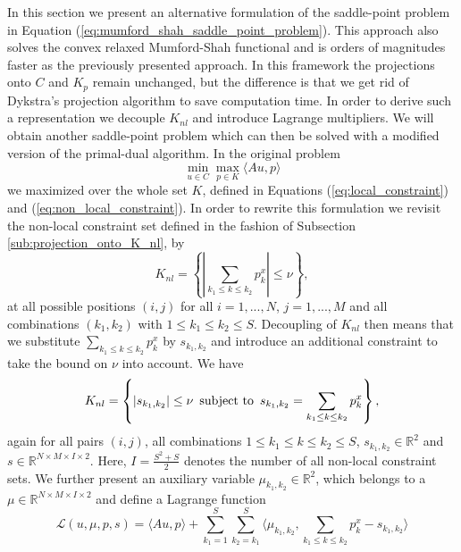 \documentclass[abstracton]{scrreprt}
\begin{document}
        In this section we present an alternative formulation of the saddle-point problem in Equation (\ref{eq:mumford_shah_saddle_point_problem}). This approach also solves the convex relaxed Mumford-Shah functional and is orders of magnitudes faster as the previously presented approach. In this framework the projections onto $C$ and $K_{p}$ remain unchanged, but the difference is that we get rid of Dykstra's projection algorithm to save computation time. In order to derive such a representation we decouple $K_{nl}$ and introduce Lagrange multipliers. We will obtain another saddle-point problem which can then be solved with a modified version of the primal-dual algorithm. In the original problem
            \begin{equation}
                \min_{u \in C} \max_{p \in K} \langle Au, p \rangle
                \label{eq:original_saddle_point_problem}
            \end{equation}
        we maximized over the whole set $K$, defined in Equations (\ref{eq:local_constraint}) and (\ref{eq:non_local_constraint}). In order to rewrite this formulation we revisit the non-local constraint set defined in the fashion of Subsection \ref{sub:projection_onto_K_nl}, by
            $$
                K_{nl} = \left\{ \left| \sum_{k_{1} \le k \le k_{2}} p^{x}_{k} \right| \le \nu \right\},
            $$
        at all possible positions $(i,j)$ for all $i = 1, ..., N$, $j = 1, ..., M$ and all combinations $(k_{1}, k_{2})$ with $1 \le k_{1} \le k_{2} \le S$. Decoupling of $K_{nl}$ then means that we substitute $\sum_{k_{1} \le k \le k_{2}} p^{x}_{k}$ by $s_{k_{1}, k_{2}}$ and introduce an additional constraint to take the bound on $\nu$ into account. We have
            \begin{equation}
                K_{nl} = \left\{ |s_{k_{1}, k_{2}}| \le \nu \,\,\, \textnormal{subject to} \,\,\, s_{k_{1}, k_{2}} = \sum_{k_{1} \le k \le k_{2}} p^{x}_{k} \right\},
                \label{eq:non_local_constraint_reloaded}
            \end{equation}
        again for all pairs $(i,j)$, all combinations $1 \le k_{1} \le k \le k_{2} \le S$, $s_{k_{1}, k_{2}} \in \mathbb{R}^{2}$ and $s \in \mathbb{R}^{N \times M \times I \times 2}$. Here, $I = \frac{S^{2} + S}{2}$ denotes the number of all non-local constraint sets. We further present an auxiliary variable $\mu_{k_{1}, k_{2}} \in \mathbb{R}^{2}$, which belongs to a $\mu \in \mathbb{R}^{N \times M \times I \times 2}$ and define a Lagrange function
            \begin{equation}
                \mathcal{L}(u, \mu, p, s) = \langle Au, p \rangle + \sum_{k_{1} = 1}^{S} \sum_{k_{2} = k_{1}}^{S} \langle \mu_{k_{1}, k_{2}}, \sum_{k_{1} \le k \le k_{2}} p^{x}_{k} - s_{k_{1}, k_{2}} \rangle
                \label{eq:lagrangian}
            \end{equation}
\end{document}
